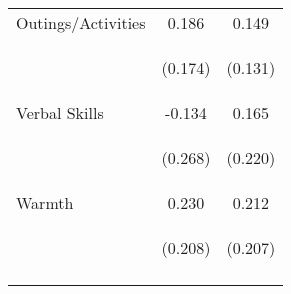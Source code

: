 \begin{tabular}{lcc}
\noalign{\smallskip}Outings/Activities & 0.186 & 0.149\\
 & \begin{footnotesize}(0.174)\end{footnotesize} & \begin{footnotesize}(0.131)\end{footnotesize}\\
\noalign{\smallskip}Verbal Skills & -0.134 & 0.165\\
 & \begin{footnotesize}(0.268)\end{footnotesize} & \begin{footnotesize}(0.220)\end{footnotesize}\\
\noalign{\smallskip}Warmth & 0.230 & 0.212\\
 & \begin{footnotesize}(0.208)\end{footnotesize} & \begin{footnotesize}(0.207)\end{footnotesize}\\
\noalign{\smallskip}\hline\end{tabular}\\
